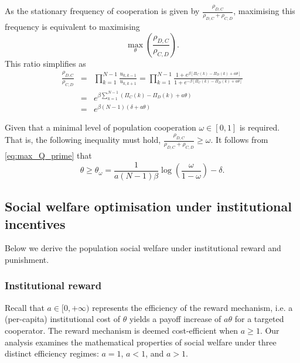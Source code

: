 \documentclass{article}
\begin{document}
As the stationary frequency of cooperation is given by
$\frac{\rho_{D,C}}{\rho_{D,C}+\rho_{C,D}}$, 
maximising this frequency is equivalent to maximising
\begin{equation}
\label{eq:max}
\max_{\theta}\left(\frac{\rho_{D,C}}{\rho_{C,D}}\right).
\end{equation}
This ratio simplifies as 
\begin{eqnarray}
\nonumber
\frac{\rho_{D,C}}{\rho_{C,D}}
&=&\prod_{k=1}^{N-1}
\frac{u_{k,k-1}}{u_{k,k+1}}
=\prod_{k=1}^{N-1}
\frac{1+e^{\beta[\Pi_C(k)-\Pi_D(k)+a\theta]}}
{1+e^{-\beta[\Pi_C(k)-\Pi_D(k)+a\theta]}} \\
\nonumber
&=& e^{\beta\sum_{k=1}^{N-1}(\Pi_C(k)-\Pi_D(k)+a\theta)} \\
\label{eq:max_Q_prime}
&=& e^{\beta(N-1)(\delta+a\theta)}
\end{eqnarray}

Given that a minimal   level of population cooperation $\omega\in[0,1]$ is required. That is, the following inequality must hold,
$
\frac{\rho_{D,C}}{\rho_{D,C}+\rho_{C,D}}\ge \omega
$. It follows from \eqref{eq:max_Q_prime} that
\begin{equation}
\label{eq:omega_fraction}
\theta \ge \theta_\omega
= \frac{1}{a(N-1)\beta}
\log\!\left(\frac{\omega}{1-\omega}\right)-\delta.
\end{equation}


\subsection{Social welfare optimisation under institutional incentives}
Below we derive the population social welfare under institutional reward and punishment. 

\subsubsection{Institutional reward} Recall that $a \in [0,+\infty)$  represents the efficiency of the reward mechanism, i.e. a (per-capita) institutional cost of $\theta$ yields a payoff increase of $a\theta$ for a targeted cooperator. The reward mechanism is deemed cost-efficient when $a \ge 1$. Our analysis examines the mathematical properties of social welfare under three distinct efficiency regimes: $a = 1$, $a < 1$, and $a > 1$.
\end{document}
